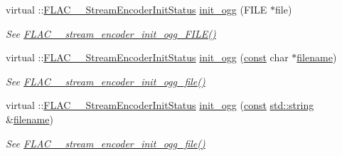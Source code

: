 \begin{DoxyCompactItemize}
virtual \+::\hyperlink{group__flac__stream__encoder_ga3bb869620af2b188d77982a5c30b047d}{F\+L\+A\+C\+\_\+\+\_\+\+Stream\+Encoder\+Init\+Status} \hyperlink{class_f_l_a_c_1_1_encoder_1_1_file_a2a95e849d42c7ef1909e174b3b6fb164}{init\+\_\+ogg} (F\+I\+LE $\ast$file)
\begin{DoxyCompactList}\small\item\em See \hyperlink{group__flac__stream__encoder_gab44c7f51a61826e04abd8cdf5c1ceac2}{F\+L\+A\+C\+\_\+\+\_\+stream\+\_\+encoder\+\_\+init\+\_\+ogg\+\_\+\+F\+I\+L\+E()} \end{DoxyCompactList}\item 
virtual \+::\hyperlink{group__flac__stream__encoder_ga3bb869620af2b188d77982a5c30b047d}{F\+L\+A\+C\+\_\+\+\_\+\+Stream\+Encoder\+Init\+Status} \hyperlink{class_f_l_a_c_1_1_encoder_1_1_file_afc81d83f6d371fafecaabc6e471bc32c}{init\+\_\+ogg} (\hyperlink{getopt1_8c_a2c212835823e3c54a8ab6d95c652660e}{const} char $\ast$\hyperlink{test__portburn_8cpp_a7efa5e9c7494c7d4586359300221aa5d}{filename})
\begin{DoxyCompactList}\small\item\em See \hyperlink{group__flac__stream__encoder_ga51eb79f04e9a676cd1ce0c94729252e4}{F\+L\+A\+C\+\_\+\+\_\+stream\+\_\+encoder\+\_\+init\+\_\+ogg\+\_\+file()} \end{DoxyCompactList}\item 
virtual \+::\hyperlink{group__flac__stream__encoder_ga3bb869620af2b188d77982a5c30b047d}{F\+L\+A\+C\+\_\+\+\_\+\+Stream\+Encoder\+Init\+Status} \hyperlink{class_f_l_a_c_1_1_encoder_1_1_file_ab26a1712df14d2bfda537d76d803bb89}{init\+\_\+ogg} (\hyperlink{getopt1_8c_a2c212835823e3c54a8ab6d95c652660e}{const} \hyperlink{test__lib_f_l_a_c_2format_8c_ab02026ad0de9fb6c1b4233deb0a00c75}{std\+::string} \&\hyperlink{test__portburn_8cpp_a7efa5e9c7494c7d4586359300221aa5d}{filename})
\begin{DoxyCompactList}\small\item\em See \hyperlink{group__flac__stream__encoder_ga51eb79f04e9a676cd1ce0c94729252e4}{F\+L\+A\+C\+\_\+\+\_\+stream\+\_\+encoder\+\_\+init\+\_\+ogg\+\_\+file()} \end{DoxyCompactList}\end{DoxyCompactItemize}
